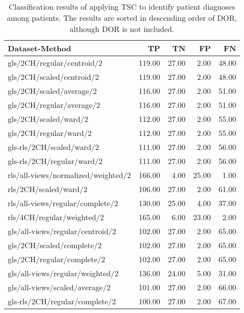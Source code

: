\begin{longtable}{lrrrr}
    \caption{Classification results of applying TSC to identify patient diagnoses among patients.
             The results are sorted in descending order of DOR, although DOR is not included.}
    \label{tab:tsc_ind_raw_results}
    \hline
    Dataset-Method                            &     TP &    TN &    FP &    FN \\
    \hline
    gls/2CH/regular/centroid/2                & 119.00 & 27.00 &  2.00 & 48.00 \\
    gls/2CH/scaled/centroid/2                 & 119.00 & 27.00 &  2.00 & 48.00 \\
    gls/2CH/scaled/average/2                  & 116.00 & 27.00 &  2.00 & 51.00 \\
    gls/2CH/regular/average/2                 & 116.00 & 27.00 &  2.00 & 51.00 \\
    gls/2CH/scaled/ward/2                     & 112.00 & 27.00 &  2.00 & 55.00 \\
    gls/2CH/regular/ward/2                    & 112.00 & 27.00 &  2.00 & 55.00 \\
    gls-rls/2CH/scaled/ward/2                 & 111.00 & 27.00 &  2.00 & 56.00 \\
    gls-rls/2CH/regular/ward/2                & 111.00 & 27.00 &  2.00 & 56.00 \\
    rls/all-views/normalized/weighted/2       & 166.00 &  4.00 & 25.00 &  1.00 \\
    rls/2CH/scaled/ward/2                     & 106.00 & 27.00 &  2.00 & 61.00 \\
    rls/all-views/regular/complete/2          & 130.00 & 25.00 &  4.00 & 37.00 \\
    rls/4CH/regular/weighted/2                & 165.00 &  6.00 & 23.00 &  2.00 \\
    gls/all-views/regular/centroid/2          & 102.00 & 27.00 &  2.00 & 65.00 \\
    gls/2CH/scaled/complete/2                 & 102.00 & 27.00 &  2.00 & 65.00 \\
    gls/2CH/regular/complete/2                & 102.00 & 27.00 &  2.00 & 65.00 \\
    gls/all-views/regular/weighted/2          & 136.00 & 24.00 &  5.00 & 31.00 \\
    gls/all-views/scaled/average/2            & 101.00 & 27.00 &  2.00 & 66.00 \\
    gls-rls/2CH/regular/complete/2            & 100.00 & 27.00 &  2.00 & 67.00 \\

\end{longtable}

